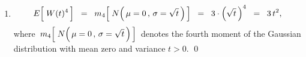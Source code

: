 \begin{enumerate}
\item
	\begin{equation*}
	E\!\left[\; W(\overset{{\color{white}.}}{t})^{4} \,\right]
	\;\; = \;\;
		m_{4}\!\left[\; N\!\left(\,\overset{{\color{white}.}}{\mu = 0}\,,\,\sigma = \sqrt{t}\,\right) \,\right]
	\;\; = \;\;
		3\cdot\left(\sqrt{t}\,\right)^{4}
	\;\; = \;\;
		3\,t^{2},
	\end{equation*}
	where
	\,$m_{4}\!\left[\; N\!\left(\,\overset{{\color{white}.}}{\mu = 0}\,,\,\sigma = \sqrt{t}\,\right) \,\right]$\,
	denotes the fourth moment of the Gaussian distribution with mean zero and variance $t > 0$.
	\qed
\end{enumerate}

